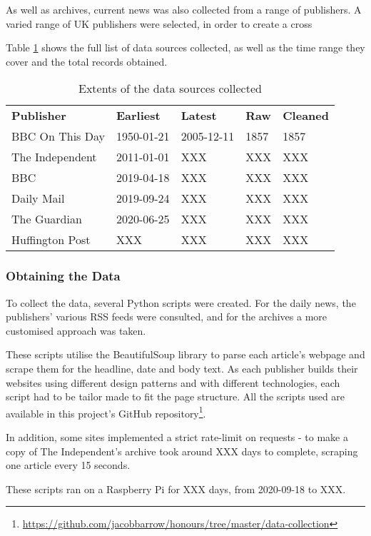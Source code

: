 As well as archives, current news was also collected from a range of publishers. A varied range of UK publishers were selected, in order to create a cross

Table \ref{tab:data-sources} shows the full list of data sources collected, as well as the time range they cover and the total records obtained.

\begin{table}[h]
\begin{tabular}{lllll}
\textbf{Publisher} & \textbf{Earliest} & \textbf{Latest} & \textbf{Raw} & \textbf{Cleaned} \\
BBC On This Day & 1950-01-21 & 2005-12-11 & 1857 & 1857 \\
The Independent & 2011-01-01 & XXX & XXX & XXX  \\
BBC & 2019-04-18 & XXX & XXX & XXX  \\
Daily Mail & 2019-09-24 & XXX & XXX & XXX \\
The Guardian & 2020-06-25 & XXX & XXX & XXX \\
Huffington Post & XXX & XXX & XXX & XXX \\
\end{tabular}
\caption{Extents of the data sources collected}
\label{tab:data-sources}
\end{table}

\subsubsection{Obtaining the Data} \label{obtaining-data}
To collect the data, several Python scripts were created. For the daily news, the publishers' various RSS feeds were consulted, and for the archives a more customised approach was taken.

These scripts utilise the BeautifulSoup library to parse each article's webpage and scrape them for the headline, date and body text. As each publisher builds their websites using different design patterns and with different technologies, each script had to be tailor made to fit the page structure. All the scripts used are available in this project's GitHub repository\footnote{\url{https://github.com/jacobbarrow/honours/tree/master/data-collection}}.

In addition, some sites implemented a strict rate-limit on requests - to make a copy of The Independent's archive took around XXX days to complete, scraping one article every 15 seconds. 

These scripts ran on a Raspberry Pi for XXX days, from 2020-09-18 to XXX.


